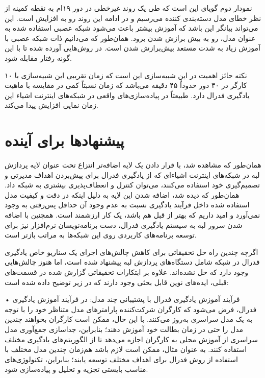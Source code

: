 نمودار دوم گویای این است که طی یک روند غیرخطی در دور ۱۹ام به نقطه کمینه از نظر خطای مدل دسته‌بندی کننده می‌رسیم و در ادامه این روند رو به افزایش است. این می‌تواند بیانگر این باشد که آموزش بیشتر باعث می‌شود شبکه عصبی استفاده شده به عنوان مدل، رو به بیش برازش شدن برود. همان‌طور که می‌دانیم ذات شبکه عصبی با آموزش زیاد به شدت مستعد بیش‌برازش شدن است. در \cite{bookG} روش‌هایی آورده شده تا با این‌ گونه رفتار مقابله شود.

نکته حائز اهمیت در این شبیه‌سازی این است که زمان تقریبی این شبیه‌سازی با ۱۰ کارگر در ۴۰ دور حدوداً ۴۵ دقیقه می‌باشد که زمان نسبتاً کمی در مقایسه با ماهیت یادگیری فدرال دارد. طبیعتاً در پیاده‌سازی‌های واقعی در شبکه‌های اینترنت اشیاء این زمان نمایی افزایش پیدا می‌کند.

\section{ پیشنهادها برای آینده}

همان‌طور که مشاهده شد، با قرار دادن یک لایه اضافه‌تر انتزاع تحت عنوان لایه پردازش لبه در شبکه‌های اینترنت اشیاء‌ای که از یادگیری فدرال برای پیش‌بردن اهداف مدیرتی و تصمیم‌گیری خود استفاده می‌کنند، می‌توان کنترل و انعطاف‌پذیری بیشتری به شبکه داد. همان‌طور که دیده‌ شد، اضافه شدن این لایه به دلیل اینکه در دقت و کیفیت مدل استفاده شده داخل فرآیند یادگیری نسبت به عدم وجود آن حداقل پس‌رفتی به وجود نمی‌آورد و امید داریم که بهتر از قبل هم باشد، یک کار ارزشمند است. همچنین با اضافه شدن سرور لبه به سیستم یادگیری فدرال، دست برنامه‌نویسان نرم‌افزار نیز برای توسعه برنامه‌های کاربردی روی این شبکه‌ها به مراتب بازتر است.


اگرچه چندین راه حل تحقیقاتی برای کاهش چالش‌های اجرای یک سناریو خاص یادگیری فدرال  در شبکه شامل دستگاه‌های پردازش لبه پیشنهاد شده است، اما هنوز چالش‌هایی وجود دارد که حل نشده‌اند. علاوه بر ابتکارات تحقیقاتی گزارش شده در قسمت‌‌های قبلی، ایده‌های نوین قابل بحثی وجود دارند که در زیر توضیح داده شده است:
 
• فرآیند آموزش یادگیری فدرال با پشتیبانی چند مدل: در فرآیند آموزش یادگیری فدرال، فرض می‌شود که کارگران شرکت‌کننده پارامترهای مدل متناظر خود را با توجه به یک مدل سراسری به‌روز می‌کنند. با این حال، ممکن است کارگران بخواهند چندین مدل را حتی در زمان بطالت خود آموزش دهند؛ بنابراین، جداسازی جمع‌آوری مدل سراسری از آموزش محلی به کارگران اجازه می‌دهد تا از الگوریتم‌های یادگیری مختلف استفاده کنند. به عنوان مثال، ممکن است لازم باشد هم‌زمان چندین مدل مختلف با استفاده از روش فدرال برای اهداف مختلف توسعه یابند؛ بنابراین، تکنولوژی‌های مناسب بایستى تجزیه و تحلیل و پیاده‌سازی شود.
 
